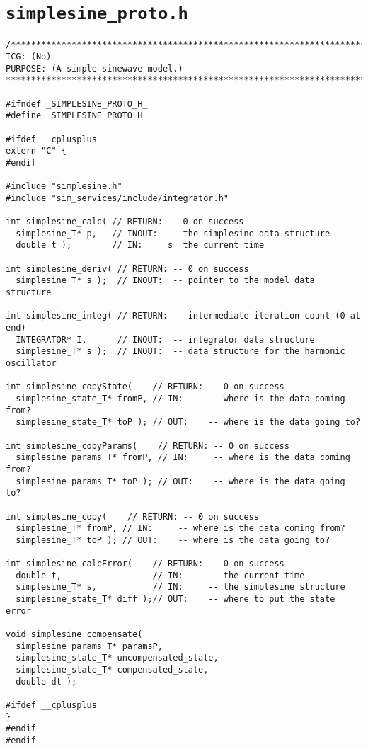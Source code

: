 \section{\tt simplesine\_proto.h}\label{sec:simplesine-proto-h}

\begin{lstlisting}[caption={\tt simplesine\_proto.h},label={list:simplesine-proto-h}]
/***********************************************************************
ICG: (No)
PURPOSE: (A simple sinewave model.)
***********************************************************************/

#ifndef _SIMPLESINE_PROTO_H_
#define _SIMPLESINE_PROTO_H_

#ifdef __cplusplus
extern "C" {
#endif

#include "simplesine.h"
#include "sim_services/include/integrator.h"

int simplesine_calc( // RETURN: -- 0 on success
  simplesine_T* p,   // INOUT:  -- the simplesine data structure
  double t );        // IN:     s  the current time

int simplesine_deriv( // RETURN: -- 0 on success
  simplesine_T* s );  // INOUT:  -- pointer to the model data structure

int simplesine_integ( // RETURN: -- intermediate iteration count (0 at end)
  INTEGRATOR* I,      // INOUT:  -- integrator data structure
  simplesine_T* s );  // INOUT:  -- data structure for the harmonic oscillator

int simplesine_copyState(    // RETURN: -- 0 on success
  simplesine_state_T* fromP, // IN:     -- where is the data coming from?
  simplesine_state_T* toP ); // OUT:    -- where is the data going to?

int simplesine_copyParams(    // RETURN: -- 0 on success
  simplesine_params_T* fromP, // IN:     -- where is the data coming from?
  simplesine_params_T* toP ); // OUT:    -- where is the data going to?

int simplesine_copy(    // RETURN: -- 0 on success
  simplesine_T* fromP, // IN:     -- where is the data coming from?
  simplesine_T* toP ); // OUT:    -- where is the data going to?

int simplesine_calcError(    // RETURN: -- 0 on success
  double t,                  // IN:     -- the current time
  simplesine_T* s,           // IN:     -- the simplesine structure
  simplesine_state_T* diff );// OUT:    -- where to put the state error

void simplesine_compensate(
  simplesine_params_T* paramsP,
  simplesine_state_T* uncompensated_state,
  simplesine_state_T* compensated_state,
  double dt );

#ifdef __cplusplus
}
#endif
#endif
\end{lstlisting}

